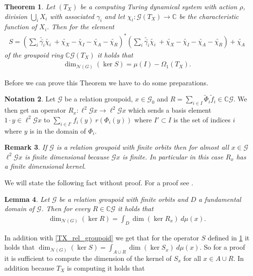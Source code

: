 \documentclass[12pt,a4paper]{scrartcl}
\theoremstyle{plain}
\newtheorem{Theorem}{Theorem}[section]
\newtheorem{Lemma}[Theorem]{Lemma}
\newtheorem{Remark}[Theorem]{Remark}
\theoremstyle{definition}
\newtheorem{Notation}[Theorem]{Notation}
\numberwithin{equation}{section}
\newcommand{\C}{\mathbb{C}} %
\newcommand{\2}{\mathbb{Z} / 2 \mathbb{Z}}
\newcommand{\G}{\mathcal{G}}
\newcommand{\1}{\bar{1}}
\newcommand{\0}{\bar{0}}
\begin{document}
\begin{Theorem} \label{groserSatz}
	Let $(T_X)$ be a computing Turing dynamical system with action $\rho$, division $\bigcup_i X_i$ with associated $\gamma_i$ and let $\chi_i \colon\G(T_X) \to \C$ be the characteristic function of $X_i$. Then for the element
	\begin{align*}
		S = (\sum_{i} \tilde{\bar{\gamma_i}} \tilde{\chi_i} \ + \tilde{\chi_X} - \tilde{\chi_I} - \tilde{\chi_A} - \tilde{\chi_R})^*(\sum_{i} \tilde{\bar{\gamma_i}} \tilde{\chi_i} \ + \tilde{\chi_X} - \tilde{\chi_I} - \tilde{\chi_A} - \tilde{\chi_R}) + \tilde{\chi_A}
	\end{align*}
	of the groupoid ring $\C \G(T_X)$ it holds that
	\begin{align*}
		\dim_{\mathcal{N}(G)}(\ker S) = \mu(I) - \Omega_1(T_X).
	\end{align*}
\end{Theorem}
Before we can prove this Theorem we have to do some preparations. 
\begin{Notation}
	Let $\G$ be a relation groupoid, $x \in \G_0$ and $R = \sum_{i \in I} \tilde \Phi_i\tilde f_i \in \C\G$. We then get an operator $R_x\colon\ell^2\G x \to \ell^2\G x$ which sends a basis element $1 \cdot y \in \ell^2\G x$ to $\sum_{i \in I'} f_i(y) ~ r(\Phi_i(y)) $ where $I' \subset I$ is the set of indices $i$ where $y$ is in the domain of $\Phi_i$. 
\end{Notation}
\begin{Remark}
	If $\G$ is a relation groupoid with finite orbits then for almost all $x \in \G$ $\ell^2\G x$ is finite dimensional because $\G x$ is finite. In particular in this case $R_x$ has a finite dimensional kernel.
\end{Remark}
We will state the following fact without proof. For a proof see \cite{GRAB}.
\begin{Lemma} \label{T_to_Tx}
	Let $\G$ be a relation groupoid with finite orbits and $D$ a fundamental domain of $\G$. Then for every $R \in \C \G$ it holds that
	\begin{align*}
		\dim_{\mathcal{N}(G)}(\ker R) = \int_D \dim (\ker R_x) \ d \mu (x).
	\end{align*} 
\end{Lemma}
In addition with \ref{TX_rel_groupoid} we get that for the operator $S$ defined in \ref{groserSatz} it holds that $\dim_{\mathcal{N}(G)}(\ker S) = \int_{A \cup R} \dim (\ker S_x) \ d \mu (x)$. So for a proof it is sufficient to compute the dimension of the kernel of $S_x$ for all $x \in A \cup R$. In addition because $T_X$ is computing it holds that
\end{document}
